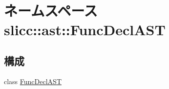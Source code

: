 \hypertarget{namespaceslicc_1_1ast_1_1FuncDeclAST}{
\section{ネームスペース slicc::ast::FuncDeclAST}
\label{namespaceslicc_1_1ast_1_1FuncDeclAST}
}
\subsection*{構成}
\begin{DoxyCompactItemize}
\item 
class \hyperlink{classslicc_1_1ast_1_1FuncDeclAST_1_1FuncDeclAST}{FuncDeclAST}
\end{DoxyCompactItemize}
